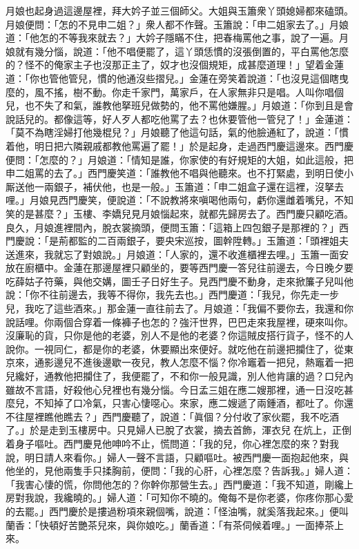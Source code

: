 月娘也起身過這邊屋裡，拜大妗子並三個師父。大姐與玉簫衆丫頭媳婦都來磕頭。月娘便問：「怎的不見申二姐？」衆人都不作聲。玉簫說：「申二姐家去了。」月娘道：「他怎的不等我來就去？」大妗子隱瞞不住，把春梅罵他之事，說了一遍。月娘就有幾分惱，{}說道：「他不唱便罷了，這丫頭恁慣的沒張倒置的，平白罵他怎麼的？怪不的俺家主子也沒那正主了，奴才也沒個規矩，成甚麼道理！」{}望着金蓮道：「你也管他管兒，慣的他通沒些摺兒。」金蓮在旁笑着說道：「也沒見這個瞎曳麼的，風不搖，樹不動。你走千家門，萬家戶，在人家無非只是唱。人叫你唱個兒，也不失了和氣，誰教他拏班兒做勢的，他不罵他嫌腥。」月娘道：「你到且是會說話兒的。都像這等，好人歹人都吃他罵了去？也休要管他一管兒了！」金蓮道：「莫不為瞎淫婦打他幾棍兒？」{}月娘聽了他這句話，氣的他臉通紅了，說道：「慣着他，明日把六隣親戚都教他罵遍了罷！」於是起身，走過西門慶這邊來。西門慶便問：「怎麼的？」月娘道：「情知是誰，你家使的有好規矩的大姐，如此這般，把申二姐罵的去了。」西門慶笑道：「誰教他不唱與他聽來。{}也不打緊處，到明日使小厮送他一兩銀子，補伏他，也是一般。」玉簫道：「申二姐盒子還在這裡，沒拏去哩。」月娘見西門慶笑，便說道：「不說教將來嗔喝他兩句，{}虧你還雌着嘴兒，不知笑的是甚麼？」玉樓、李嬌兒見月娘惱起來，就都先歸房去了。西門慶只顧吃酒。良久，月娘進裡間內，脫衣裳摘頭，便問玉簫：「這箱上四包銀子是那裡的？」西門慶說：「是荊都監的二百兩銀子，要央宋巡按，圖幹陞轉。」玉簫道：「頭裡姐夫送進來，我就忘了對娘說。」月娘道：「人家的，還不收進櫃裡去哩。」玉簫一面安放在廚櫃中。金蓮在那邊屋裡只顧坐的，要等西門慶一答兒往前邊去，今日晚夕要吃薛姑子符藥，與他交媾，圖壬子日好生子。見西門慶不動身，走來掀簾子兒叫他說：「你不往前邊去，我等不得你，我先去也。」{}西門慶道：「我兒，你先走一步兒，我吃了這些酒來。」那金蓮一直往前去了。月娘道：「我偏不要你去，{}我還和你說話哩。你兩個合穿着一條褲子也怎的？強汗世界，巴巴走來我屋裡，硬來叫你。沒廉恥的貨，只你是他的老婆，別人不是他的老婆？你這賊皮搭行貨子，怪不的人說你。一視同仁，都是你的老婆，休要顯出來便好。{}就吃他在前邊把攔住了，從東京來，通影邊兒不進後邊歇一夜兒，教人怎麼不惱？你冷竈着一把兒，熱竈着一把兒纔好，通教他把攔住了，我便罷了，不和你一般見識，別人他肯讓的過？{}口兒內雖故不言語，好殺他心兒裡也有幾分惱。{}今日孟三姐在應二嫂那裡，通一日沒吃甚麼兒，不知掉了口冷氣，只害心悽噁心。來家，應二嫂遞了兩鍾酒，都吐了。你還不往屋裡瞧他瞧去？」{}西門慶聽了，說道：「眞個？分付收了家伙罷，我不吃酒了。」於是走到玉樓房中。只見婦人已脫了衣裳，摘去首飾，渾衣兒𢱉在炕上，正倒着身子嘔吐。西門慶見他呻吟不止，慌問道：「我的兒，你心裡怎麼的來？對我說，明日請人來看你。」{}婦人一聲不言語，只顧嘔吐。被西門慶一面抱起他來，與他坐的，見他兩隻手只揉胸前，便問：「我的心肝，心裡怎麼？告訴我。」婦人道：「我害心悽的慌，你問他怎的？你幹你那營生去。」西門慶道：「我不知道，剛纔上房對我說，我纔曉的。」婦人道：「可知你不曉的。{}俺每不是你老婆，你疼你那心愛的去罷。」西門慶於是摟過粉項來親個嘴，說道：「怪油嘴，就奚落我起來。」便叫蘭香：「快頓好苦艷茶兒來，與你娘吃。」蘭香道：「有茶伺候着哩。」一面捧茶上來。

